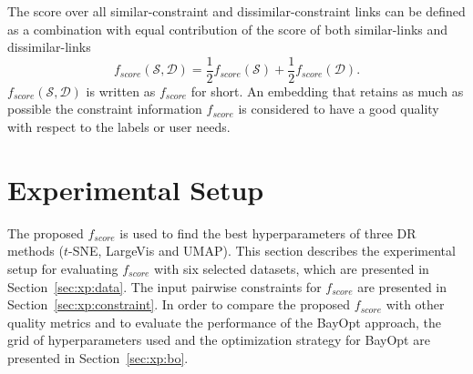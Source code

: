 The score over all similar-constraint and dissimilar-constraint links can be defined as a combination with equal contribution of the score of both similar-links and dissimilar-links 
\begin{equation}
f_{score}(\mathcal{S},\mathcal{D}) = \frac{1}{2}f_{score}(\mathcal{S}) + \frac{1}{2}f_{score}(\mathcal{D}).
\end{equation}
$f_{score}(\mathcal{S},\mathcal{D})$ is written as $f_{score}$ for short.
An embedding that retains as much as possible the constraint information $f_{score}$ is considered to have a good quality with respect to the labels or user needs.

\section{Experimental Setup}\label{sec:xp:setup}

The proposed $f_{score}$ is used to find the best hyperparameters of three DR methods ($t$-SNE, LargeVis and UMAP).
This section describes the experimental setup for evaluating $f_{score}$ with six selected datasets, which are presented in Section~\ref{sec:xp:data}.
The input pairwise constraints for $f_{score}$ are presented in Section~\ref{sec:xp:constraint}.
In order to compare the proposed $f_{score}$ with other quality metrics and to evaluate the performance of the BayOpt approach, the grid of hyperparameters used and the optimization strategy for BayOpt are presented in Section~\ref{sec:xp:bo}.

